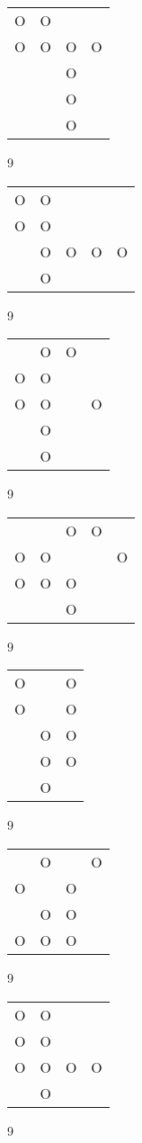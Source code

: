 \begin{tabular}{|m{0.2cm}m{0.2cm}m{0.2cm}m{0.2cm}|}\hline
O&O& & \\
O&O&O&O\\
 & &O& \\
 & &O& \\
 & &O& \\
\hline\end{tabular}9
\begin{tabular}{|m{0.2cm}m{0.2cm}m{0.2cm}m{0.2cm}m{0.2cm}|}\hline
O&O& & & \\
O&O& & & \\
 &O&O&O&O\\
 &O& & & \\
\hline\end{tabular}9
\begin{tabular}{|m{0.2cm}m{0.2cm}m{0.2cm}m{0.2cm}|}\hline
 &O&O& \\
O&O& & \\
O&O& &O\\
 &O& & \\
 &O& & \\
\hline\end{tabular}9
\begin{tabular}{|m{0.2cm}m{0.2cm}m{0.2cm}m{0.2cm}m{0.2cm}|}\hline
 & &O&O& \\
O&O& & &O\\
O&O&O& & \\
 & &O& & \\
\hline\end{tabular}9
\begin{tabular}{|m{0.2cm}m{0.2cm}m{0.2cm}|}\hline
O& &O\\
O& &O\\
 &O&O\\
 &O&O\\
 &O& \\
\hline\end{tabular}9
\begin{tabular}{|m{0.2cm}m{0.2cm}m{0.2cm}m{0.2cm}|}\hline
 &O& &O\\
O& &O& \\
 &O&O& \\
O&O&O& \\
\hline\end{tabular}9
\begin{tabular}{|m{0.2cm}m{0.2cm}m{0.2cm}m{0.2cm}|}\hline
O&O& & \\
O&O& & \\
O&O&O&O\\
 &O& & \\
\hline\end{tabular}9
